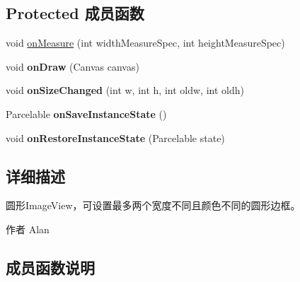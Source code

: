 \subsection*{Protected 成员函数}
\begin{DoxyCompactItemize}
\item 
void \mbox{\hyperlink{classcom_1_1example_1_1twitter_1_1_round_image_view_ac2cc66398b656c8add4ce983d95fd4ef}{on\+Measure}} (int width\+Measure\+Spec, int height\+Measure\+Spec)
\item 
\mbox{\label{classcom_1_1example_1_1twitter_1_1_round_image_view_a5dfe6f262a1e16eb669fa7c37c99d5c2}} 
void {\bfseries on\+Draw} (Canvas canvas)
\item 
\mbox{\label{classcom_1_1example_1_1twitter_1_1_round_image_view_a41021daf584df7583ea649d55014cf1d}} 
void {\bfseries on\+Size\+Changed} (int w, int h, int oldw, int oldh)
\item 
\mbox{\label{classcom_1_1example_1_1twitter_1_1_round_image_view_aa6c65fcc8cf7b89ac37aae841848396c}} 
Parcelable {\bfseries on\+Save\+Instance\+State} ()
\item 
\mbox{\label{classcom_1_1example_1_1twitter_1_1_round_image_view_ab5ae026debaeb9357fe453b17db4d755}} 
void {\bfseries on\+Restore\+Instance\+State} (Parcelable state)
\end{DoxyCompactItemize}


\subsection{详细描述}
圆形\+Image\+View，可设置最多两个宽度不同且颜色不同的圆形边框。

\begin{DoxyAuthor}{作者}
Alan 
\end{DoxyAuthor}


\subsection{成员函数说明}
\mbox{\label{classcom_1_1example_1_1twitter_1_1_round_image_view_ac2cc66398b656c8add4ce983d95fd4ef}} 
